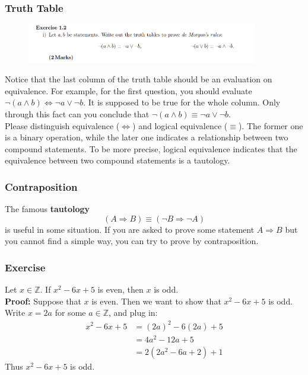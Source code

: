 \documentclass{beamer}
\begin{document}
\begin{frame}
    \frametitle{Truth Table}
    \begin{figure}
        \centering
        \includegraphics[width=0.9\textwidth]{ex1.png}
    \end{figure}
    \hspace{1em}
        Notice that the last column of the truth table should be an evaluation on equivalence. 
    For example, for the first question, you should evaluate $\neg (a \wedge b)\Leftrightarrow \neg a \vee \neg b$. 
    It is supposed to be true for the whole column. 
    Only through this fact can you conclude that 
    $\neg(a \wedge b) \equiv \neg a\vee \neg b$.
    \\ \hspace{1em}
    Please distinguish equivalence ($\Leftrightarrow$) and logical equivalence ($\equiv$). 
    The former one is a binary operation, 
    while the later one indicates a relationship 
    between two compound statements. To be more precise, logical equivalence indicates that the equivalence between two compound statements is a tautology.
\end{frame}
\begin{frame}
    \frametitle{Contraposition}
    The famous \textbf{tautology}
    $$(A \Rightarrow B) \equiv (\neg B \Rightarrow \neg A)$$
is useful in some situation. If you are asked to prove some statement $A \Rightarrow B$ but
you cannot find a simple way, you can try to prove by contraposition.
    \vspace{2em}
\end{frame}
\begin{frame}
    \frametitle{Exercise}
    Let $x \in \mathbb{Z}$. If $x^2-6x+5$ is even, then $x$ is odd.\\
    \pause
    \vspace{2em}
    \textbf{Proof:} Suppose that $x$ is even. Then we want to show that $x^2 - 6x + 5$ is odd.
    Write $x = 2a$ for some $a \in \mathbb{Z}$, and plug in:
    \begin{align*}
        x^2-6x+5 &= (2a)^2-6 (2a)+5 \\
                 &= 4 a^2 -12 a +5 \\
                 &= 2 (2a^2-6a +2)+1 
    \end{align*}
    Thus $x^2-6x+5$ is odd.
\end{frame}
\end{document}
